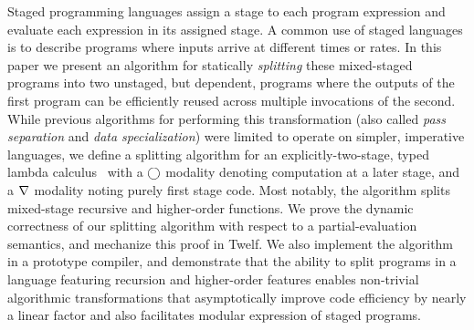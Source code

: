 
Staged programming languages assign a stage to each program expression
and evaluate each expression in its assigned stage. A common use of
staged languages is to describe programs where inputs arrive at
different times or rates. In this paper we present an algorithm for
statically {\em splitting} these mixed-staged programs into two
unstaged, but dependent, programs where the outputs of the first
program can be efficiently reused across multiple invocations of the
second. While previous algorithms for performing this transformation
(also called \emph{pass separation} and \emph{data specialization})
were limited to operate on simpler, imperative languages, we define a
splitting algorithm for an explicitly-two-stage, typed lambda
calculus \lang\ with a $\bigcirc$ modality denoting computation at a later
stage, and a $\nabla$ modality noting purely first stage code.  Most
notably, the algorithm splits mixed-stage recursive and higher-order
functions.  We prove the dynamic correctness of our splitting
algorithm with respect to a partial-evaluation semantics, and
mechanize this proof in Twelf. We also implement the algorithm
in a prototype compiler, and demonstrate that the ability to split
programs in a language featuring recursion and higher-order features
enables non-trivial algorithmic transformations that asymptotically
improve code efficiency by nearly a linear factor and also
facilitates modular expression of staged programs.

